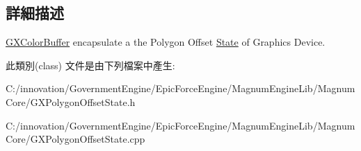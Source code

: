\subsection{詳細描述}
\hyperlink{class_i_dream_sky_1_1_g_x_color_buffer}{G\+X\+Color\+Buffer} encapsulate a the Polygon Offset \hyperlink{class_i_dream_sky_1_1_state}{State} of Graphics Device. 

此類別(class) 文件是由下列檔案中產生\+:\begin{DoxyCompactItemize}
\item 
C\+:/innovation/\+Government\+Engine/\+Epic\+Force\+Engine/\+Magnum\+Engine\+Lib/\+Magnum\+Core/G\+X\+Polygon\+Offset\+State.\+h\item 
C\+:/innovation/\+Government\+Engine/\+Epic\+Force\+Engine/\+Magnum\+Engine\+Lib/\+Magnum\+Core/G\+X\+Polygon\+Offset\+State.\+cpp\end{DoxyCompactItemize}

